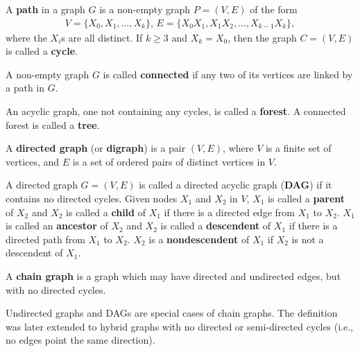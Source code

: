 \begin{definition}
\label{def:path}
A \textbf{path} in a graph $G$ is a non-empty graph $P = (V,E)$ of the form 
\begin{align*}
V = \{X_0, X_1, \dots, X_k\} \text{,    } E = \{X_0X_1, X_1X_2, \dots, X_{k-1}X_k\},
\end{align*}
where the $X_i$s are all distinct. If $k \ge 3$ and $X_k =X_0$, then the graph $C = (V,E)$ is called a \textbf{cycle}.
\end{definition}

\begin{definition}
\label{def:connected}
A non-empty graph $G$ is called \textbf{connected} if any two of its vertices are linked by a path in $G$. 
\end{definition}

\begin{definition}
\label{def:tree}
An acyclic graph, one not containing any cycles, is called a \textbf{forest}. A connected forest is called a \textbf{tree}. 
\end{definition}

\begin{definition}
\label{def:digraph}
A \textbf{directed graph} (or \textbf{digraph}) is a pair $(V,E)$, where $V$ is a finite set of vertices, and $E$ is a set of ordered pairs of distinct vertices in $V$.
\end{definition}

\begin{definition}
\label{def:dag}
A directed graph $G = (V, E)$ is called a directed acyclic graph (\textbf{DAG}) if it contains no directed cycles. Given nodes $X_1$ and $X_2$ in $V$, $X_1$ is called a \textbf{parent} of $X_2$ and $X_2$ is called a \textbf{child} of $X_1$ if there is a directed edge from $X_1$ to $X_2$. $X_1$ is called an \textbf{ancestor} of $X_2$ and $X_2$ is called a \textbf{descendent} of $X_1$ if there is a directed path from $X_1$ to $X_2$. $X_2$ is a \textbf{nondescendent} of $X_1$ if $X_2$ is not a descendent of $X_1$.
\end{definition}

\begin{definition}
A \textbf{chain graph} \cite{frydenberg1990chain} is a graph which may have directed and undirected edges, but with no directed cycles.  
\end{definition}
Undirected graphs and DAGs are special cases of chain graphs. The definition was later extended to hybrid graphs with no directed or semi-directed cycles (i.e., no edges point the same direction). 


